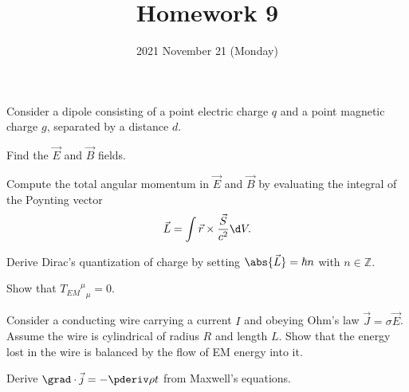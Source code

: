\documentclass{phys151}
\title{Homework 9}
\date{2021 November 21 (Monday)}
\author{}
\begin{document}
\begin{problem}
  Consider a dipole consisting of a point electric charge \(q\) and a point
  magnetic charge \(g\), separated by a distance \(d\).
  \begin{subproblems}
    \item Find the \(\vec E\) and \(\vec B\) fields.
    \item Compute the total angular momentum in \(\vec E\) and \(\vec B\) by
      evaluating the integral of the Poynting vector
      \[
        \vec L = \int \vec r \times \frac {\vec S} {c^2} \d V.
      \]
    \item Derive Dirac's quantization of charge by setting \(\abs{\vec L} =
      \hbar n\) with \(n\in\mathbb Z\).
  \end{subproblems}
\end{problem}

\begin{solution}

\end{solution}

\begin{problem}
  Show that \({{T_{EM}}^\mu}_\mu = 0\).
\end{problem}

\begin{solution}

\end{solution}

\begin{problem}
  Consider a conducting wire carrying a current \(I\) and obeying Ohm's law
  \(\vec J = \sigma \vec E\).  Assume the wire is cylindrical of radius \(R\)
  and length \(L\).  Show that the energy lost in the wire is balanced by the
  flow of EM energy into it.
\end{problem}

\begin{solution}

\end{solution}

\begin{problem}
  Derive \(\grad\cdot\vec j = -\pderiv \rho t\) from Maxwell's equations.
\end{problem}

\begin{solution}

\end{solution}
\end{document}
